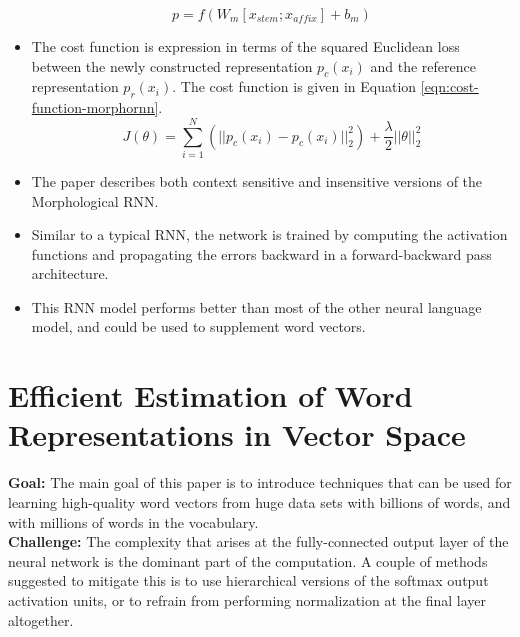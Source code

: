 \documentclass[11pt,a4paper]{article}
\begin{document}
\begin{itemize}
    \begin{equation} \label{eqn:parent-vector}
      p = f (W_m [x_{stem} ; x_{affix}] + b_m)
    \end{equation}
    \item
    The cost function is expression in terms of the squared Euclidean loss between the newly constructed representation $p_c(x_i)$ and the reference representation $p_r(x_i)$. The cost function is given in Equation \ref{eqn:cost-function-morphornn}.
    \begin{equation} \label{eqn:cost-function-morphornn}
      J(\theta) = \sum_{i=1}^N (|| p_c(x_i) - p_c(x_i) ||^2_2) + \frac{\lambda}{2} ||\theta||^2_2
    \end{equation}
    \item
    The paper describes both context sensitive and insensitive versions of the Morphological RNN.
    \item
    Similar to a typical RNN, the network is trained by computing the activation functions and propagating the errors backward in a forward-backward pass architecture.
    \item 
    This RNN model performs better than most of the other neural language model, and could be used to supplement word vectors.
  \end{itemize}



\section{Efficient Estimation of Word Representations in Vector Space} %
\label{sec:efficient_estimation_of_word_representations_in_vector_space}

  \textbf{Goal:}
  The main goal of this paper is to introduce techniques that can be used for learning high-quality word vectors from huge data sets with billions of words, and with millions of words in the vocabulary\cite{mikolov2013efficient}.\\

  \textbf{Challenge:}
  The complexity that arises at the fully-connected output layer of the neural network is the dominant part of the computation. A couple of methods suggested to mitigate this is to use hierarchical versions of the softmax output activation units, or to refrain from performing normalization at the final layer altogether.\\
\end{document}
